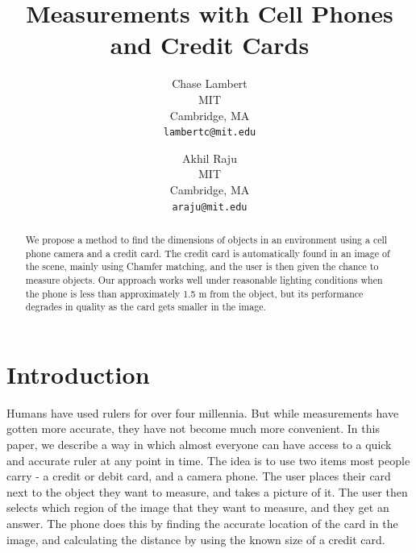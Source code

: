 \documentclass[10pt,twocolumn,letterpaper]{article}
\begin{document}
\title{Measurements with Cell Phones and Credit Cards}

\author{Chase Lambert\\
MIT\\
Cambridge, MA\\
{\tt\small lambertc@mit.edu}
\and
Akhil Raju\\
MIT\\
Cambridge, MA\\
{\tt\small araju@mit.edu}
}

\maketitle

\begin{abstract}
We propose a method to find the dimensions of objects in an environment using a cell phone camera and a credit card. The credit card is automatically found in an image of the scene, mainly using Chamfer matching, and the user is then given the chance to measure objects. Our approach works well under reasonable lighting conditions when the phone is less than approximately 1.5 m from the object, but its performance degrades in quality as the card gets smaller in the image.
\end{abstract}

\section{Introduction}

Humans have used rulers for over four millennia. But while measurements have gotten more accurate, they have not become much more convenient. In this paper, we describe a way in which almost everyone can have access to a quick and accurate ruler at any point in time. The idea is to use two items most people carry - a credit or debit card, and a camera phone. The user places their card next to the object they want to measure, and takes a picture of it. The user then selects which region of the image that they want to measure, and they get an answer. The phone does this by finding the accurate location of the card in the image, and calculating the distance by using the known size of a credit card.
\end{document}
